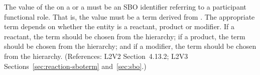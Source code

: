 The value of the   on a \SpeciesReference or a
\ModifierSpeciesReference must be an SBO identifier referring to a
participant functional role.  That is, the value must be a term derived
from \sboparticipantfunctional.  The appropriate term depends on whether
the entity is a reactant, product or modifier.  If a reactant, the term
should be chosen from the \sboreactant hierarchy; if a product, the term
should be chosen from the \sboproduct hierarchy; and if a modifier, the
term should be chosen from the \sbomodifier hierarchy.  (References: 
L2V2 Section~4.13.2; L2V3 Sections~\ref{sec:reaction-sboterm} and~\ref{sec:sbo}.)
